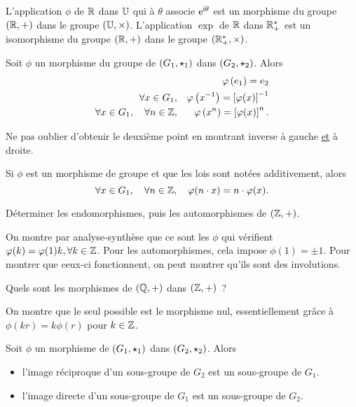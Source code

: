 \documentclass{magnolia}
\begin{document}
\begin{remarqueUnique}
\remarque L'application $\phi$ de $\mathbb{R}$ dans $\U$ qui à $\theta$ associe
  ${\rm e}^{{\rm i}\theta}$ est un morphisme du groupe $(\mathbb{R},+)$ dans le groupe $(\U,\times)$.
  L'application $\exp$ de $\mathbb{R}$ dans $\mathbb{R}_+^*$ est un isomorphisme du
  groupe $(\mathbb{R},+)$ dans le groupe $(\mathbb{R}_+^*,\times)$. 
\end{remarqueUnique}


\begin{proposition}
Soit $\phi$ un morphisme du groupe de $\left(G_1,\star_1\right)$ dans $\left(G_2,\star_2\right)$.
Alors
\begin{eqnarray*}
& & \varphi\left(e_1\right)=e_2\\
\forall x\in G_1, & & \varphi\left(x^{-1}\right)=\left[\varphi(x)\right]^{-1} \\
\forall x\in G_1 ,\quad \forall n\in\mathbb{Z}, & & \varphi\left(x^n\right)=\left[\varphi(x)\right]^n.
\end{eqnarray*}
\end{proposition}

\begin{preuve}
Ne pas oublier d'obtenir le deuxième point en montrant inverse à gauche \underline{et} à droite.
\end{preuve}

\begin{remarqueUnique}
\remarque Si $\phi$ est un morphisme de groupe et que les lois sont notées additivement, alors
  \[\forall x\in G_1,\quad \forall n\in\mathbb{Z},\quad \varphi(n\cdot x)=n\cdot\varphi(x).\]
\end{remarqueUnique}

\begin{exos}
\exo Déterminer les endomorphismes, puis les automorphismes de $(\mathbb{Z},+)$.
\begin{sol}
On montre par analyse-synthèse que ce sont les $\phi$ qui vérifient $\varphi(k)=\varphi(1)k, \forall k \in \mathbb{Z}$. Pour les automorphismes, cela impose $\phi(1)=\pm 1$. Pour montrer que ceux-ci fonctionnent, on peut montrer qu'ils sont des involutions.
\end{sol}
\exo Quels sont les morphismes de $(\mathbb{Q},+)$ dans $(\mathbb{Z},+)$~?
\begin{sol}
On montre que le seul possible est le morphisme nul, essentiellement grâce à $\phi(kr)=k\phi(r)$ pour $k\in\mathbb{Z}$.
\end{sol}
\end{exos}

\begin{proposition}
Soit $\phi$ un morphisme de $\left(G_1,\star_1\right)$ dans $\left(G_2,\star_2\right)$. Alors
\begin{itemize}
\item l'image réciproque d'un sous-groupe de $G_2$ est un sous-groupe de $G_1$.
\item l'image directe d'un sous-groupe de $G_1$ est un sous-groupe de $G_2$.
\end{itemize}
\end{proposition}
\end{document}
